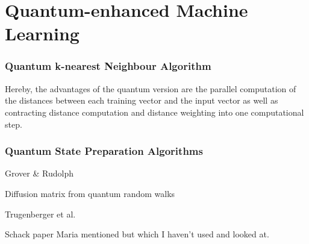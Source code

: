 \chapter{Quantum-enhanced Machine Learning}\label{sec:qml}

\subsection{Quantum k-nearest Neighbour Algorithm}
\label{subsubsec:quantumknearestneighbour}

Hereby, the advantages of the quantum version are the parallel computation of the distances between each training vector and the input vector as well as contracting distance computation and distance weighting into one computational step.

\subsection{Quantum State Preparation Algorithms}
\label{subsubsec:quantumstatepreparation}

Grover \& Rudolph

Diffusion matrix from quantum random walks

Trugenberger et al.

Schack paper Maria mentioned but which I haven't used and looked at.